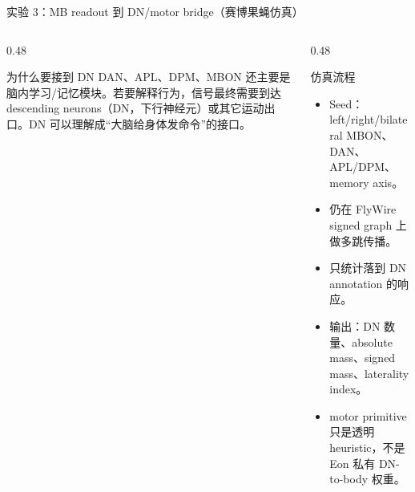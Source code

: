\documentclass[aspectratio=169,10pt,fontset=none]{ctexbeamer}
\begin{document}
\begin{frame}{实验 3：MB readout 到 DN/motor bridge（赛博果蝇仿真）}
\small
\begin{columns}[T,onlytextwidth]
  \begin{column}{0.48\textwidth}
    \begin{block}{为什么要接到 DN}
      DAN、APL、DPM、MBON 还主要是脑内学习/记忆模块。若要解释行为，信号最终需要到达 descending neurons（DN，下行神经元）或其它运动出口。DN 可以理解成“大脑给身体发命令”的接口。
    \end{block}
  \end{column}
  \begin{column}{0.48\textwidth}
    \begin{block}{仿真流程}
      \begin{itemize}
        \item Seed：left/right/bilateral MBON、DAN、APL/DPM、memory axis。
        \item 仍在 FlyWire signed graph 上做多跳传播。
        \item 只统计落到 DN annotation 的响应。
        \item 输出：DN 数量、absolute mass、signed mass、laterality index。
        \item motor primitive 只是透明 heuristic，不是 Eon 私有 DN-to-body 权重。
      \end{itemize}
    \end{block}
  \end{column}
\end{columns}
\end{frame}
\end{document}
